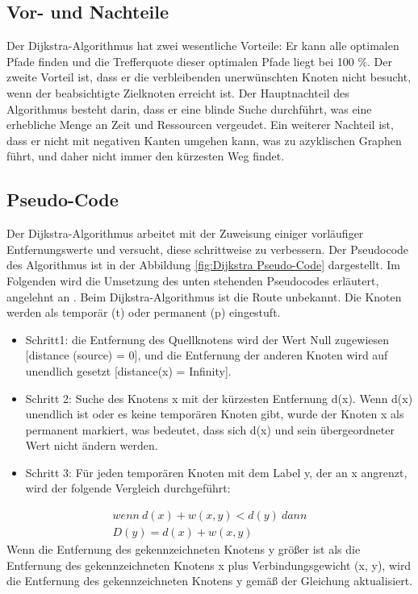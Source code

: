 \subsection{Vor- und Nachteile}

Der Dijkstra-Algorithmus hat zwei wesentliche Vorteile: Er kann alle optimalen Pfade finden und die Trefferquote dieser optimalen Pfade liegt bei 100 \%. Der zweite Vorteil ist, dass er die verbleibenden unerwünschten Knoten nicht besucht, wenn der beabsichtigte Zielknoten erreicht ist\cite{Zhou:19,Abusalim2020}.
\newline
\newline
Der Hauptnachteil des Algorithmus besteht darin, dass er eine blinde Suche durchführt, was eine erhebliche Menge an Zeit und Ressourcen vergeudet. Ein weiterer Nachteil ist, dass er nicht mit negativen Kanten umgehen kann, was zu azyklischen Graphen führt, und daher nicht immer den kürzesten Weg findet\cite{Mukhlif2020}.

\subsection{Pseudo-Code}

Der Dijkstra-Algorithmus arbeitet mit der Zuweisung einiger vorläufiger Entfernungswerte und versucht, diese schrittweise zu verbessern. Der Pseudocode des Algorithmus ist in der Abbildung \ref{fig:Dijkstra Pseudo-Code}  dargestellt\cite{Huang2012}.
\newline
\newline
Im Folgenden wird die Umsetzung des unten stehenden Pseudocodes erläutert, angelehnt an  \cite{Abusalim2020}.
\newline
Beim Dijkstra-Algorithmus ist die Route unbekannt. Die Knoten werden als temporär (t) oder permanent (p) eingestuft.
\begin{itemize}
	\item  Schritt1: die Entfernung des Quellknotens wird der Wert Null zugewiesen [distance (source) = 0], und die Entfernung der anderen Knoten wird auf unendlich gesetzt [distance(x) = Infinity].
	\item Schritt 2: Suche des Knotens x mit der kürzesten Entfernung d(x). Wenn d(x) unendlich ist oder es keine temporären Knoten gibt, wurde der Knoten x als permanent markiert, was bedeutet, dass sich d(x) und sein übergeordneter Wert nicht ändern werden.
	\item Schritt 3: Für jeden temporären Knoten mit dem Label y, der an x angrenzt, wird der folgende Vergleich durchgeführt:

	
\end{itemize}
\begin{gather*} 
		wenn \ d(x) + w (x, y) < d(y)  \ dann \\
		D(y) = d(x) + w (x, y)
\end{gather*}
\newline
Wenn die Entfernung des gekennzeichneten Knotens y größer ist als die Entfernung des gekennzeichneten Knotens x plus Verbindungsgewicht (x, y), wird die Entfernung des gekennzeichneten Knotens y gemäß der Gleichung aktualisiert.


